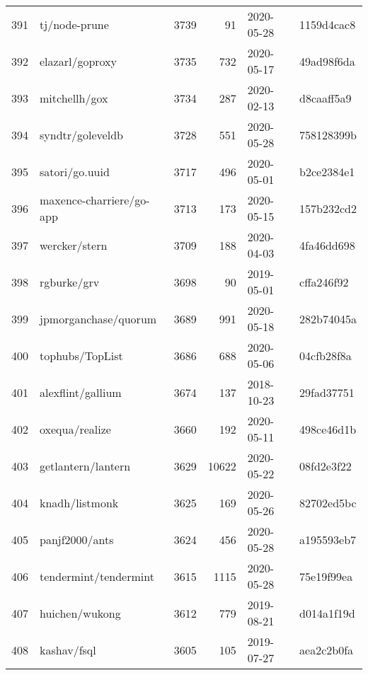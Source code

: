 \begin{longtable}{llrrll}
    391 &                                      tj/node-prune &   3739 &     91 & 2020-05-28 &  1159d4cac8 \\
    392 &                                    elazarl/goproxy &   3735 &    732 & 2020-05-17 &  49ad98f6da \\
    393 &                                      mitchellh/gox &   3734 &    287 & 2020-02-13 &  d8caaff5a9 \\
    394 &                                   syndtr/goleveldb &   3728 &    551 & 2020-05-28 &  758128399b \\
    395 &                                     satori/go.uuid &   3717 &    496 & 2020-05-01 &  b2ce2384e1 \\
    396 &                           maxence-charriere/go-app &   3713 &    173 & 2020-05-15 &  157b232cd2 \\
    397 &                                      wercker/stern &   3709 &    188 & 2020-04-03 &  4fa46dd698 \\
    398 &                                        rgburke/grv &   3698 &     90 & 2019-05-01 &  cffa246f92 \\
    399 &                               jpmorganchase/quorum &   3689 &    991 & 2020-05-18 &  282b74045a \\
    400 &                                    tophubs/TopList &   3686 &    688 & 2020-05-06 &  04cfb28f8a \\
    401 &                                  alexflint/gallium &   3674 &    137 & 2018-10-23 &  29fad37751 \\
    402 &                                     oxequa/realize &   3660 &    192 & 2020-05-11 &  498ce46d1b \\
    403 &                                 getlantern/lantern &   3629 &  10622 & 2020-05-22 &  08fd2e3f22 \\
    404 &                                     knadh/listmonk &   3625 &    169 & 2020-05-26 &  82702ed5bc \\
    405 &                                     panjf2000/ants &   3624 &    456 & 2020-05-28 &  a195593eb7 \\
    406 &                              tendermint/tendermint &   3615 &   1115 & 2020-05-28 &  75e19f99ea \\
    407 &                                     huichen/wukong &   3612 &    779 & 2019-08-21 &  d014a1f19d \\
    408 &                                        kashav/fsql &   3605 &    105 & 2019-07-27 &  aea2c2b0fa \\

\end{longtable}

